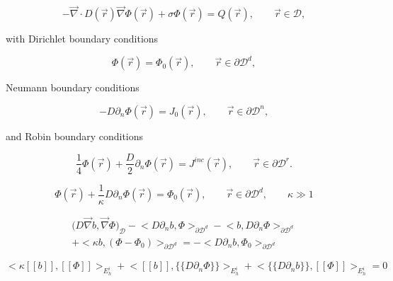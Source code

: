 \begin{equation}
\label{eq::DSA_standard_diff_eq}
- \vec{\nabla}  \cdot D (\vec{r})  \vec{\nabla} \Phi (\vec{r}) + \sigma \Phi (\vec{r}) = Q (\vec{r}) , \qquad \vec{r} \in \mathcal{D} ,
\end{equation}

\noindent with Dirichlet boundary conditions

\begin{equation}
\label{eq::DSA_standard_diff_eq_dirichlet_bound}
\Phi (\vec{r}) = \Phi_0 (\vec{r}), \qquad \vec{r} \in \partial \mathcal{D}^d ,
\end{equation}

\noindent Neumann boundary conditions

\begin{equation}
\label{eq::DSA_standard_diff_eq_neumann_bound}
- D \partial_n \Phi (\vec{r}) = J_0 (\vec{r}), \qquad \vec{r} \in \partial \mathcal{D}^n ,
\end{equation}

\noindent and Robin boundary conditions

\begin{equation}
\label{eq::DSA_standard_diff_eq_robin_bound}
\frac{1}{4}\Phi (\vec{r}) + \frac{D}{2} \partial_n \Phi (\vec{r}) = J^{inc} (\vec{r}), \qquad \vec{r} \in \partial \mathcal{D}^r .
\end{equation}



\begin{equation}
\label{eq::penalty_boundary_term}
\Phi (\vec{r}) +\frac{1}{\kappa} D \partial_n \Phi (\vec{r}) = \Phi_0 (\vec{r}), \qquad \vec{r} \in \partial \mathcal{D}^d, \qquad \kappa \gg 1
\end{equation}

\begin{equation}
\label{eq::SIP_boundary_laplacian_term}
\begin{aligned}
\Big(  D \vec{\nabla}  b , \vec{\nabla} \Phi  \Big)_{\mathcal{D}} - \Big<   D \partial_n b, \Phi \Big>_{\partial \mathcal{D}^d} - \Big<  b, D \partial_n \Phi \Big>_{\partial \mathcal{D}^d} \\ + \Big< \kappa b,  (\Phi - \Phi_0) \Big>_{\partial \mathcal{D}^d} = - \Big< D \partial_n b ,  \Phi_0 \Big>_{\partial \mathcal{D}^d} 
\end{aligned}
\end{equation}

\begin{equation}
\label{eq::SIP_interior_laplacian_term}
\Big< \kappa [\![   b ]\!] , [\![  \Phi ]\!]\Big>_{E_h^i} + \Big<  [\![   b ]\!] , \{\!\{  D \partial_n \Phi \}\!\}\Big>_{E_h^i} + \Big< \{\!\{  D \partial_n  b \}\!\} , [\![  \Phi ]\!]\Big>_{E_h^i} = 0
\end{equation}

